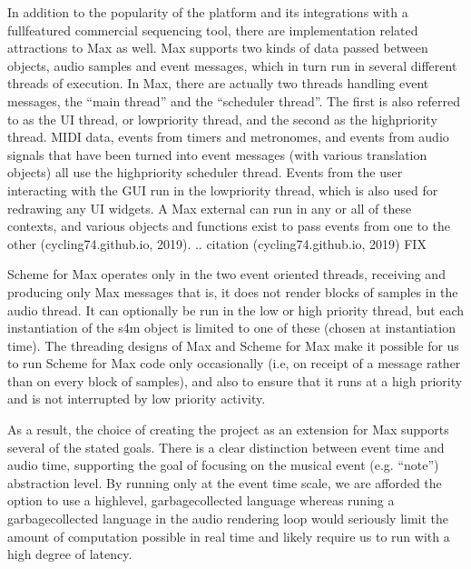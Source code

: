 \documentclass[letterpaper,10pt,english]{sphinxmanual}
\begin{document}
\sphinxAtStartPar
In addition to the popularity of the platform and its integrations with a full\sphinxhyphen{}featured commercial sequencing tool,
there are implementation related attractions to Max as well.
Max supports two kinds of data passed between objects, audio samples and event messages, which in turn run in several
different threads of execution.
In Max, there are actually two threads handling event messages, the “main thread” and the “scheduler thread”.
The first is also referred to as the UI thread, or low\sphinxhyphen{}priority thread, and the second as the high\sphinxhyphen{}priority thread.
MIDI data, events from timers and metronomes, and events from audio signals that have been turned into event messages
(with various translation objects) all use the high\sphinxhyphen{}priority scheduler thread.
Events from the user interacting with the GUI run in the low\sphinxhyphen{}priority thread, which is also used for redrawing any UI widgets.
A Max external can run in any or all of these contexts, and various objects and functions exist to pass events from one to the other
(cycling74.github.io, 2019).
.. citation (cycling74.github.io, 2019) FIX

\sphinxAtStartPar
Scheme for Max operates only in the two event oriented threads, receiving and producing only Max messages \sphinxhyphen{}
that is, it does not render blocks of samples in the audio thread.
It can optionally be run in  the low or high priority thread, but each instantiation of the s4m object
is limited to one of these (chosen at instantiation time).
The threading designs of Max and Scheme for Max make it possible for us to run Scheme for Max code only occasionally
(i.e, on receipt of a message rather than on every block of samples), and also to ensure that it runs at a high priority
and is not interrupted by low priority activity.

\sphinxAtStartPar
As a result, the choice of creating the project as an extension for Max supports several of the stated goals.
There is a clear distinction between event time and audio time, supporting the goal of focusing on
the musical event (e.g. “note”) abstraction level.
By running only at the event time scale, we are afforded the option to use a high\sphinxhyphen{}level, garbage\sphinxhyphen{}collected language \sphinxhyphen{}
whereas runing a garbage\sphinxhyphen{}collected language in the audio rendering loop would seriously limit the amount of
computation possible in real time and likely require us to run with a high degree of latency.
\end{document}
